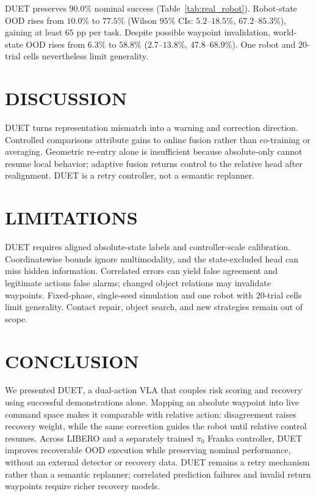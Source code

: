 \documentclass[letterpaper, 10 pt, conference]{ieeeconf}
\begin{document}
DUET preserves $90.0\%$ nominal success (Table~\ref{tab:real_robot}). Robot-state OOD rises from $10.0\%$ to $77.5\%$ (Wilson $95\%$ CIs: $5.2$--$18.5\%$, $67.2$--$85.3\%$), gaining at least $65$ pp per task. Despite possible waypoint invalidation, world-state OOD rises from $6.3\%$ to $58.8\%$ ($2.7$--$13.8\%$, $47.8$--$68.9\%$). One robot and $20$-trial cells nevertheless limit generality.

\section{DISCUSSION}

DUET turns representation mismatch into a warning and correction direction. Controlled comparisons attribute gains to online fusion rather than co-training or averaging. Geometric re-entry alone is insufficient because absolute-only cannot resume local behavior; adaptive fusion returns control to the relative head after realignment. DUET is a retry controller, not a semantic replanner.

\section{LIMITATIONS}

DUET requires aligned absolute-state labels and controller-scale calibration. Coordinatewise bounds ignore multimodality, and the state-excluded head can miss hidden information. Correlated errors can yield false agreement and legitimate actions false alarms; changed object relations may invalidate waypoints. Fixed-phase, single-seed simulation and one robot with $20$-trial cells limit generality. Contact repair, object search, and new strategies remain out of scope.

\section{CONCLUSION}

We presented DUET, a dual-action VLA that couples risk scoring and recovery using successful demonstrations alone. Mapping an absolute waypoint into live command space makes it comparable with relative action: disagreement raises recovery weight, while the same correction guides the robot until relative control resumes. Across LIBERO and a separately trained $\pi_0$ Franka controller, DUET improves recoverable OOD execution while preserving nominal performance, without an external detector or recovery data. DUET remains a retry mechanism rather than a semantic replanner; correlated prediction failures and invalid return waypoints require richer recovery models.

\FloatBarrier
\balance


\end{document}
